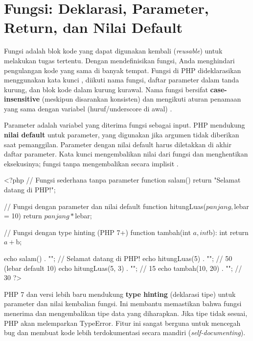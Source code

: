 ﻿\section{Fungsi: Deklarasi, Parameter, Return, dan Nilai Default}

Fungsi adalah blok kode yang dapat digunakan kembali (\textit{reusable}) untuk melakukan tugas tertentu. Dengan mendefinisikan fungsi, Anda menghindari pengulangan kode yang sama di banyak tempat. Fungsi di PHP dideklarasikan menggunakan kata kunci , diikuti nama fungsi, daftar parameter dalam tanda kurung, dan blok kode dalam kurung kurawal. Nama fungsi bersifat \textbf{case-insensitive} (meskipun disarankan konsisten) dan mengikuti aturan penamaan yang sama dengan variabel (huruf/underscore di awal) \cite{phpManual}.

Parameter adalah variabel yang diterima fungsi sebagai input. PHP mendukung \textbf{nilai default} untuk parameter, yang digunakan jika argumen tidak diberikan saat pemanggilan. Parameter dengan nilai default harus diletakkan di akhir daftar parameter. Kata kunci  mengembalikan nilai dari fungsi dan menghentikan eksekusinya; fungsi tanpa  mengembalikan  secara implisit \cite{phpRightWay}.

\begin{webcode}[language=PHP, caption={Fungsi dengan parameter, default, dan return}]
<?php
// Fungsi sederhana tanpa parameter
function salam() {
    return "Selamat datang di PHP!";
}

// Fungsi dengan parameter dan nilai default
function hitungLuas($panjang, $lebar = 10) {
    return $panjang * $lebar;
}

// Fungsi dengan type hinting (PHP 7+)
function tambah(int $a, int $b): int {
    return $a + $b;
}

echo salam() . "\n";           // Selamat datang di PHP!
echo hitungLuas(5) . "\n";     // 50 (lebar default 10)
echo hitungLuas(5, 3) . "\n";  // 15
echo tambah(10, 20) . "\n";    // 30
?>
\end{webcode}

PHP 7 dan versi lebih baru mendukung \textbf{type hinting} (deklarasi tipe) untuk parameter dan nilai kembalian fungsi. Ini membantu memastikan bahwa fungsi menerima dan mengembalikan tipe data yang diharapkan. Jika tipe tidak sesuai, PHP akan melemparkan TypeError. Fitur ini sangat berguna untuk mencegah bug dan membuat kode lebih terdokumentasi secara mandiri (\textit{self-documenting}).


